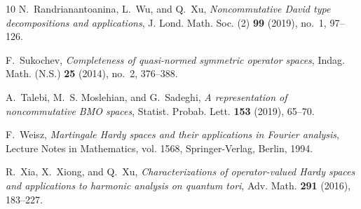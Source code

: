 \documentclass[11]{amsart}
\numberwithin{equation}{section}
\begin{document}
\begin{thebibliography}{10}
	N.~Randrianantoanina, L.~Wu, and Q.~Xu, \emph{Noncommutative {D}avid type
		decompositions and applications}, J. Lond. Math. Soc. (2) \textbf{99} (2019),
	no.~1, 97--126. 
	
	F.~Sukochev, \emph{Completeness of quasi-normed symmetric operator spaces},
	Indag. Math. (N.S.) \textbf{25} (2014), no.~2, 376--388. 
	
	A.~Talebi, M.~S. Moslehian, and G.~Sadeghi, \emph{A representation of
		noncommutative {BMO} spaces}, Statist. Probab. Lett. \textbf{153} (2019),
	65--70. 
	
	F.~Weisz, \emph{Martingale {H}ardy spaces and their applications in {F}ourier
		analysis}, Lecture Notes in Mathematics, vol. 1568, Springer-Verlag, Berlin,
	1994. 
	
	R.~Xia, X.~Xiong, and Q.~Xu, \emph{Characterizations of operator-valued {H}ardy
		spaces and applications to harmonic analysis on quantum tori}, Adv. Math.
	\textbf{291} (2016), 183--227. 
	
\end{thebibliography}
\end{document}
